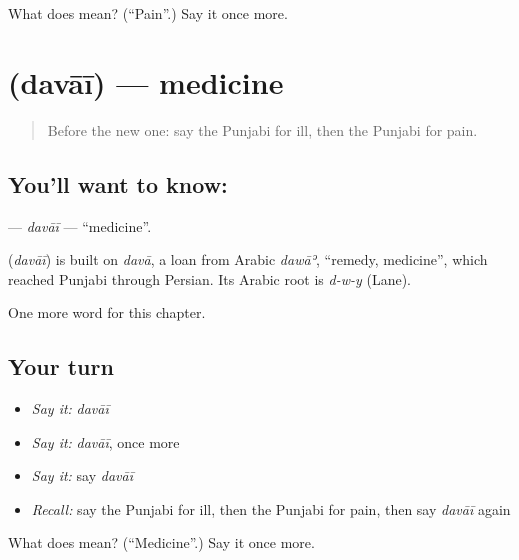 \begin{tcolorbox}[breakable,colback=teal!4,colframe=teal!35!black,title={Before you move on}]
What does  mean? (\textquotedblleft{}Pain\textquotedblright{}.) Say it once more.
\end{tcolorbox}
\section[\texorpdfstring{\pa{ਦਵਾਈ} (davāī)}{ਦਵਾਈ (davāī)}]{ (davāī) — medicine}

\label{lesson:PA-C52-davai}



\begin{quote}
Before the new one: say the Punjabi for ill, then the Punjabi for pain.
\end{quote}

\subsection*{You'll want to know: }
\textbf{} — \emph{davāī} — \textquotedblleft{}medicine\textquotedblright{}.

\begin{cousinweb}
\textbf{} (\emph{davāī}) is built on \emph{davā}, a loan from Arabic \emph{dawāʾ}, \textquotedblleft{}remedy, medicine\textquotedblright{}, which reached Punjabi through Persian. Its Arabic root is \emph{d-w-y} (Lane).
\end{cousinweb}

\begin{grammarlens}[title={What you've built}]
One more word for this chapter.
\end{grammarlens}

\subsection*{Your turn}
\begin{itemize}
\raggedright
  \item \emph{Say it:} \emph{davāī}
  \item \emph{Say it:} \emph{davāī}, once more
  \item \emph{Say it:} say \emph{davāī}
  \item \emph{Recall:} say the Punjabi for ill, then the Punjabi for pain, then say \emph{davāī} again
\end{itemize}

\begin{tcolorbox}[breakable,colback=teal!4,colframe=teal!35!black,title={Before you move on}]
What does  mean? (\textquotedblleft{}Medicine\textquotedblright{}.) Say it once more.
\end{tcolorbox}
